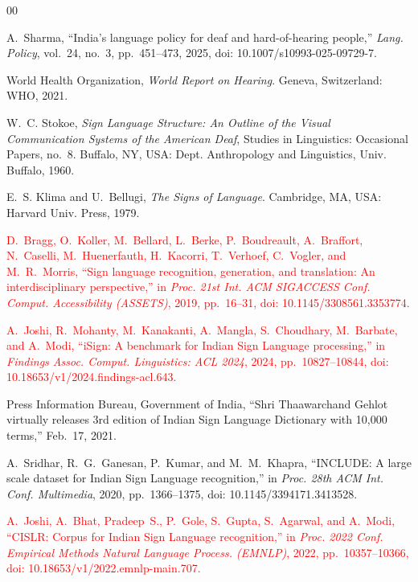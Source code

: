\documentclass[conference,a4paper,10pt]{IEEEtran}
\begin{document}
\balance
\begin{thebibliography}{00}

A.~Sharma, ``India's language policy for deaf and hard-of-hearing people,'' \emph{Lang. Policy}, vol.~24, no.~3, pp.~451--473, 2025, doi: 10.1007/s10993-025-09729-7.

World Health Organization, \emph{World Report on Hearing}. Geneva, Switzerland: WHO, 2021.

W.~C. Stokoe, \emph{Sign Language Structure: An Outline of the Visual Communication Systems of the American Deaf}, Studies in Linguistics: Occasional Papers, no.~8. Buffalo, NY, USA: Dept. Anthropology and Linguistics, Univ. Buffalo, 1960.

E.~S. Klima and U.~Bellugi, \emph{The Signs of Language}. Cambridge, MA, USA: Harvard Univ. Press, 1979.

\textcolor{red}{D.~Bragg, O.~Koller, M.~Bellard, L.~Berke, P.~Boudreault, A.~Braffort, N.~Caselli, M.~Huenerfauth, H.~Kacorri, T.~Verhoef, C.~Vogler, and M.~R.~Morris, ``Sign language recognition, generation, and translation: An interdisciplinary perspective,'' in \emph{Proc. 21st Int. ACM SIGACCESS Conf. Comput. Accessibility (ASSETS)}, 2019, pp.~16--31, doi: 10.1145/3308561.3353774.}

\textcolor{red}{A.~Joshi, R.~Mohanty, M.~Kanakanti, A.~Mangla, S.~Choudhary, M.~Barbate, and A.~Modi, ``iSign: A benchmark for Indian Sign Language processing,'' in \emph{Findings Assoc. Comput. Linguistics: ACL 2024}, 2024, pp.~10827--10844, doi: 10.18653/v1/2024.findings-acl.643.}

Press Information Bureau, Government of India, ``Shri Thaawarchand Gehlot virtually releases 3rd edition of Indian Sign Language Dictionary with 10,000 terms,'' Feb.~17, 2021.

A.~Sridhar, R.~G.~Ganesan, P.~Kumar, and M.~M.~Khapra, ``INCLUDE: A large scale dataset for Indian Sign Language recognition,'' in \emph{Proc. 28th ACM Int. Conf. Multimedia}, 2020, pp.~1366--1375, doi: 10.1145/3394171.3413528.

\textcolor{red}{A.~Joshi, A.~Bhat, Pradeep~S., P.~Gole, S.~Gupta, S.~Agarwal, and A.~Modi, ``CISLR: Corpus for Indian Sign Language recognition,'' in \emph{Proc. 2022 Conf. Empirical Methods Natural Language Process. (EMNLP)}, 2022, pp.~10357--10366, doi: 10.18653/v1/2022.emnlp-main.707.}


\end{thebibliography}
\end{document}
